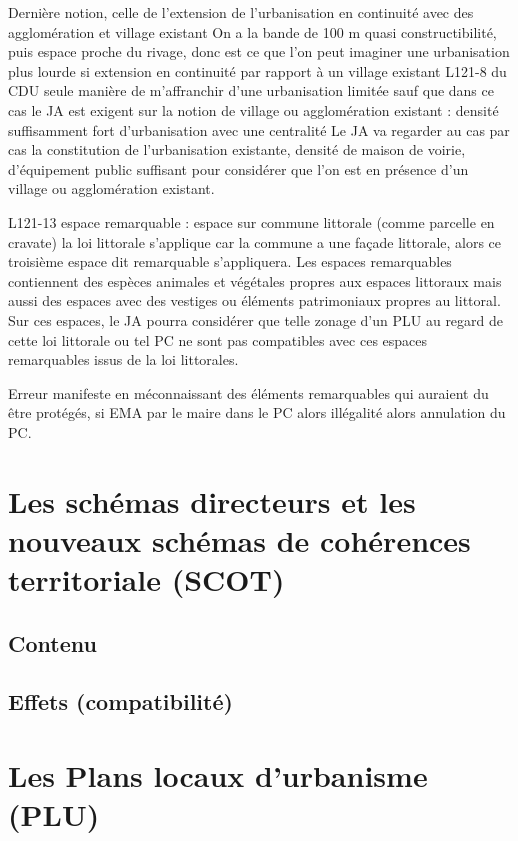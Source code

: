 	Dernière notion, celle de l’extension de l’urbanisation en continuité avec des agglomération et village existant
	On a la bande de 100 m quasi constructibilité, puis espace proche du rivage, donc est ce que l’on peut imaginer une urbanisation plus lourde si extension en continuité par rapport à un village existant L121-8 du CDU seule manière de m’affranchir d’une urbanisation limitée sauf que dans ce cas le JA est exigent sur la notion de village ou agglomération existant : densité suffisamment fort d’urbanisation avec une centralité
	Le JA va regarder au cas par cas la constitution de l’urbanisation existante, densité de maison de voirie, d’équipement public suffisant pour considérer que l’on est en présence d’un village ou agglomération existant.
	
	L121-13 espace remarquable : espace sur commune littorale (comme parcelle en cravate) la loi littorale s’applique car la commune a une façade littorale, alors ce troisième espace dit remarquable s’appliquera.
	Les espaces remarquables contiennent des espèces animales et végétales propres aux espaces littoraux mais aussi des espaces avec des vestiges ou éléments patrimoniaux propres au littoral. Sur ces espaces, le JA pourra considérer que telle zonage d’un PLU au regard de  cette loi littorale ou tel PC ne sont pas compatibles avec ces espaces remarquables issus de la loi littorales.
	
	Erreur manifeste en méconnaissant des éléments remarquables qui auraient du être protégés, si EMA par le maire dans le PC alors illégalité alors annulation du PC.
	

\section{Les schémas directeurs et les nouveaux schémas de cohérences territoriale (SCOT)}
	
	\subsection{Contenu}
	
	\subsection{Effets (compatibilité)}

\section{Les Plans locaux d'urbanisme (PLU)}
	

